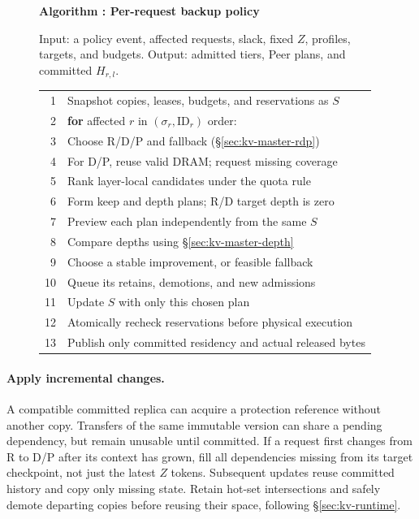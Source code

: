 \begin{figure}[htbp]
  \raggedright
  \label{alg:placement}
  \noindent\textbf{Algorithm \thedesignalgorithm: Per-request backup policy}
  \par\smallskip
  \noindent Input: a policy event, affected requests, slack, fixed $Z$, profiles,
  targets, and budgets.
  Output: admitted tiers, Peer plans, and committed $H_{r,l}$.
  \par\smallskip
  \begin{tabularx}{\columnwidth}{@{}r@{\quad}X@{}}
    \toprule
    1 & Snapshot copies, leases, budgets, and reservations as $S$ \\
    2 & \textbf{for} affected $r$ in $(\sigma_r,\mathrm{ID}_r)$ order: \\
    3 & \quad Choose R/D/P and fallback (\S\ref{sec:kv-master-rdp}) \\
    4 & \quad For D/P, reuse valid DRAM; request missing coverage \\
    5 & \quad Rank layer-local candidates under the quota rule \\
    6 & \quad Form keep and depth plans; R/D target depth is zero \\
    7 & \quad Preview each plan independently from the same $S$ \\
    8 & \quad Compare depths using \S\ref{sec:kv-master-depth} \\
    9 & \quad Choose a stable improvement, or feasible fallback \\
    10 & \quad Queue its retains, demotions, and new admissions \\
    11 & \quad Update $S$ with only this chosen plan \\
    12 & Atomically recheck reservations before physical execution \\
    13 & Publish only committed residency and actual released bytes \\
    \bottomrule
  \end{tabularx}
\end{figure}

\paragraph{Apply incremental changes.}
A compatible committed replica can acquire a protection reference without
another copy. Transfers of the same immutable version can share a pending
dependency, but remain unusable until committed. If a request first changes
from R to D/P after its context has grown, fill all dependencies missing
from its target checkpoint, not just the latest $Z$ tokens. Subsequent
updates reuse committed history and copy only missing state. Retain hot-set
intersections and safely demote departing copies before reusing their
space, following \S\ref{sec:kv-runtime}.

